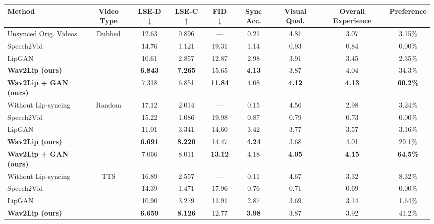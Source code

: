 \documentclass[sigconf]{acmart}
\begin{document}
\begin{table*}[ht]
  \setlength{\tabcolsep}{4pt}
    \centering
    
    \begin{tabular}{|l|c|c|c|c||c|c|c|c|}
    \hline
    
    \textbf{Method} & \textbf{Video Type} & \textbf{LSE-D $\downarrow$} & \textbf{LSE-C $\uparrow$} & \textbf{FID $\downarrow$} & \textbf{Sync Acc.} & \textbf{Visual Qual.} & \textbf{Overall Experience} & \textbf{Preference}\\
    \hline
    Unsynced Orig. Videos & \multirow{5}{*}{Dubbed} & 12.63 & 0.896 & --- & 0.21 & 4.81 & 3.07 & 3.15\% \\
    Speech2Vid~\cite{jamaludin2019you} & & 14.76 & 1.121 & 19.31 & 1.14 & 0.93 & 0.84 & 0.00\% \\
    LipGAN~\cite{kr2019towards} & & 10.61 & 2.857 & 12.87 & 2.98 & 3.91 & 3.45 & 2.35\%\\
    \textbf{Wav2Lip (ours)} & & \textbf{6.843} & \textbf{7.265} & 15.65 & \textbf{4.13} & 3.87 & 4.04 & 34.3\%\\
    \textbf{Wav2Lip + GAN (ours)} & & 7.318 & 6.851 & \textbf{11.84} & 4.08 & \textbf{4.12} & \textbf{4.13} & \textbf{60.2\%}\\
    \hline
    Without Lip-syncing & \multirow{5}{*}{Random} & 17.12 & 2.014 & --- & 0.15 & 4.56 & 2.98 & 3.24\%\\
    Speech2Vid~\cite{jamaludin2019you} & & 15.22 & 1.086 & 19.98 & 0.87 & 0.79 & 0.73 & 0.00\% \\
    LipGAN~\cite{kr2019towards} & & 11.01 & 3.341 & 14.60 & 3.42 & 3.77 & 3.57 & 3.16\%\\
    \textbf{Wav2Lip (ours)} & & \textbf{6.691} & \textbf{8.220} & 14.47 & \textbf{4.24} & 3.68 & 4.01 & 29.1\%\\
    \textbf{Wav2Lip + GAN (ours)} & & 7.066 & 8.011 & \textbf{13.12} & 4.18 & \textbf{4.05} & \textbf{4.15} & \textbf{64.5\%}\\
    \hline
    Without Lip-syncing & \multirow{6}{*}{TTS} & 16.89 & 2.557 & --- & 0.11 & 4.67 & 3.32 & 8.32\% \\
    Speech2Vid~\cite{jamaludin2019you} & & 14.39 & 1.471 & 17.96 & 0.76 & 0.71 & 0.69 & 0.00\%\\
    LipGAN~\cite{kr2019towards} & & 10.90 & 3.279 & 11.91 & 2.87 & 3.69 & 3.14 & 1.64\%\\
    \textbf{Wav2Lip (ours)} & & \textbf{6.659} & \textbf{8.126} & 12.77 & \textbf{3.98} & 3.87 & 3.92 & 41.2\%\\

\end{tabular}
\end{table*}
\end{document}
